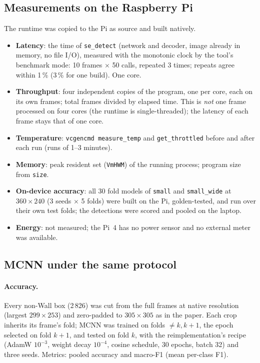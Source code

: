 \documentclass[11pt,a4paper]{article}
\newcommand{\cfg}[1]{\texttt{#1}}
\begin{document}
\subsection{Measurements on the Raspberry Pi}
\label{sec:pimethod}

The runtime was copied to the Pi as source and built natively.
\begin{itemize}
  \item \textbf{Latency}: the time of \texttt{se\_detect} (network and
        decoder, image already in memory, no file I/O), measured with the
        monotonic clock by the tool's benchmark mode: 10 frames $\times$ 50
        calls, repeated 3 times; repeats agree within 1\,\% (3\,\% for one
        build). One core.
  \item \textbf{Throughput}: four independent copies of the program, one per
        core, each on its own frames; total frames divided by elapsed time.
        This is \emph{not} one frame processed on four cores (the runtime is
        single-threaded); the latency of each frame stays that of one core.
  \item \textbf{Temperature}: \texttt{vcgencmd measure\_temp} and
        \texttt{get\_throttled} before and after each run (runs of 1--3
        minutes).
  \item \textbf{Memory}: peak resident set (\texttt{VmHWM}) of the running
        process; program size from \texttt{size}.
  \item \textbf{On-device accuracy}: all 30 fold models of \cfg{small} and
        \cfg{small\_wide} at $360 \times 240$ (3 seeds $\times$ 5 folds) were
        built on the Pi, golden-tested, and run over their own test folds; the
        detections were scored and pooled on the laptop.
  \item \textbf{Energy}: not measured; the Pi~4 has no power sensor and no
        external meter was available.
\end{itemize}

\subsection{MCNN under the same protocol}
\label{sec:mcnnmethod}

\paragraph{Accuracy.} Every non-Wall box (2\,826) was cut from the full
frames at native resolution (largest $299 \times 253$) and zero-padded to
$305 \times 305$ as in the paper. Each crop inherits its frame's fold; MCNN
was trained on folds $\neq k, k{+}1$, the epoch selected on fold $k{+}1$,
and tested on fold $k$, with the reimplementation's recipe (AdamW
$10^{-3}$, weight decay $10^{-4}$, cosine schedule, 30 epochs, batch 32) and
three seeds. Metrics: pooled accuracy and macro-F1 (mean per-class F1).
\end{document}
